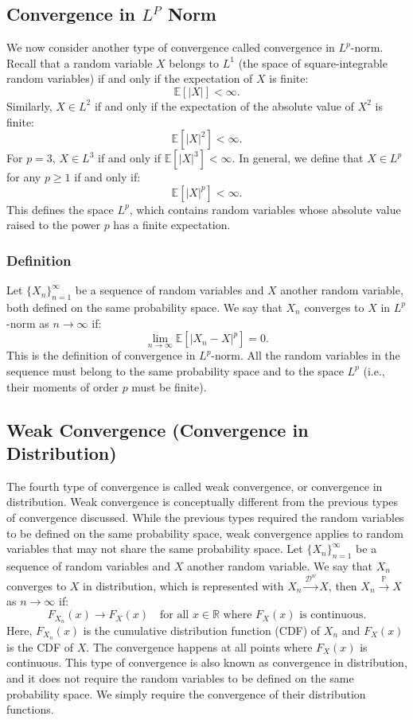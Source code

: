 \subsection{Convergence in $L^P$ Norm}  
We now consider another type of convergence called convergence in \( L^p \)-norm. Recall that a random variable \( X \) belongs to \( L^1 \) (the space of square-integrable random variables) if and only if the expectation of \( X \) is finite:
\[
\mathbb{E}[|X|] < \infty.
\]
Similarly, \( X \in L^2 \) if and only if the expectation of the absolute value of \( X^2 \) is finite:
\[
\mathbb{E}[|X|^2] < \infty.
\]
For \( p = 3 \), \( X \in L^3 \) if and only if \( \mathbb{E}[|X|^3] < \infty \). In general, we define that \( X \in L^p \) for any \( p \geq 1 \) if and only if:
\[
\mathbb{E}[|X|^p] < \infty.
\]
This defines the space \( L^p \), which contains random variables whose absolute value raised to the power \( p \) has a finite expectation.

\subsubsection{Definition}  
Let \( \{X_n\}_{n=1}^\infty \) be a sequence of random variables and \( X \) another random variable, both defined on the same probability space. We say that \( X_n \) converges to \( X \) in \( L^p \)-norm as \( n \to \infty \) if:
\[
\lim_{n \to \infty} \mathbb{E}[|X_n - X|^p] = 0.
\]
This is the definition of convergence in \( L^p \)-norm. All the random variables in the sequence must belong to the same probability space and to the space \( L^p \) (i.e., their moments of order \( p \) must be finite).

\subsection{Weak Convergence (Convergence in Distribution)}  
The fourth type of convergence is called weak convergence, or convergence in distribution. Weak convergence is conceptually different from the previous types of convergence discussed. While the previous types required the random variables to be defined on the same probability space, weak convergence applies to random variables that may not share the same probability space. \newline
Let \( \{X_n\}_{n=1}^\infty \) be a sequence of random variables and \( X \) another random variable. We say that \( X_n \) converges to \( X \) in distribution, which is represented with \(X_n \xrightarrow{\mathcal{D}^w} X\), then \(X_n \xrightarrow{\mathbb{P}} X\) as \( n \to \infty \) if:
\[
F_{X_n}(x) \to F_X(x) \quad \text{for all } x \in \mathbb{R} \text{ where } F_X(x) \text{ is continuous}.
\]
Here, \( F_{X_n}(x) \) is the cumulative distribution function (CDF) of \( X_n \) and \( F_X(x) \) is the CDF of \( X \). The convergence happens at all points where \( F_X(x) \) is continuous. \newline
This type of convergence is also known as convergence in distribution, and it does not require the random variables to be defined on the same probability space. We simply require the convergence of their distribution functions.

